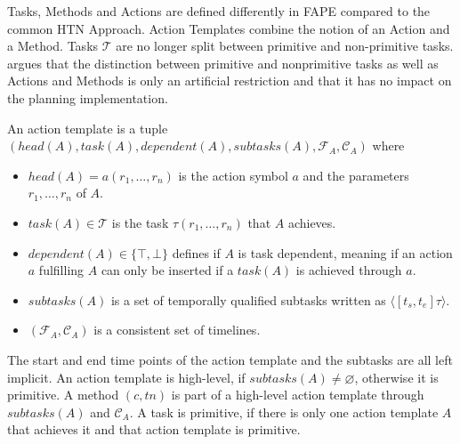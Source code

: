 
Tasks, Methods and Actions are defined differently in FAPE compared to the common HTN Approach.
Action Templates combine the notion of an Action and a Method.
Tasks $\mathcal{T}$ are no longer split between primitive and non-primitive tasks.
\cite{bit-monnotTemporalHierarchicalModels2016a} argues that the distinction between primitive and nonprimitive tasks as well as Actions and Methods is only an artificial restriction and that it has no impact on the planning implementation.

\begin{definition}
  An action template is a tuple \\ $(head(A), task(A), dependent(A), subtasks(A), \mathcal{F}_A, \mathcal{C}_A)$ where
  \begin{itemize}
    \item $head(A) = a(r_1,\dots,r_n)$ is the action symbol $a$ and the parameters $r_1,\dots,r_n$ of $A$.
    \item $task(A) \in \mathcal{T}$ is the task $\tau(r_1,\dots,r_n)$ that $A$ achieves.
    \item $dependent(A) \in \{\top,\bot\}$ defines if $A$ is task dependent, meaning if an action $a$ fulfilling $A$ can only be inserted if a $task(A)$ is achieved through $a$.
    \item $subtasks(A)$ is a set of temporally qualified subtasks written as $\langle[t_s,t_e] \tau\rangle$.
    \item $(\mathcal{F}_A, \mathcal{C}_A)$ is a consistent set of timelines.
  \end{itemize}
\end{definition}

The start and end time points of the action template and the subtasks are all left implicit.
An action template is high-level, if $subtasks(A) \neq \varnothing$, otherwise it is primitive.
A method $(c,tn)$ is part of a high-level action template through $subtasks(A)$ and $\mathcal{C}_A$.
A task is primitive, if there is only one action template $A$ that achieves it and that action template is primitive.

